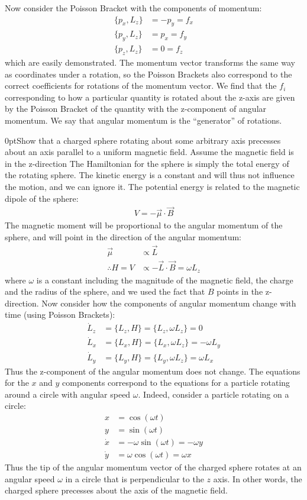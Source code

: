 Now consider the Poisson Bracket with the components of momentum:
\begin{align}
\{p_x,L_z\}&=-p_y=f_x\nonumber\\
\{p_y,L_z\}&=p_x=f_y\nonumber\\
\{p_z,L_z\}&=0=f_z
\end{align}
which are easily demonstrated. The momentum vector transforms the same way as coordinates under a rotation, so the Poisson Brackets also correspond to the correct coefficients for rotations of the momentum vector. We find that the $f_i$ corresponding to how a particular quantity is rotated about the z-axis are given by the Poisson Bracket of the quantity with the z-component of angular momentum. We say that angular momentum is the ``generator'' of rotations.

\begin{example}{0pt}{Show that a charged sphere rotating about some arbitrary axis precesses about an axis parallel to a uniform magnetic field. Assume the magnetic field is in the z-direction}{}
The Hamiltonian for the sphere is simply the total energy of the rotating sphere. The kinetic energy is a constant and will thus not influence the motion, and we can ignore it. The potential energy is related to the magnetic dipole of the sphere:
\begin{align*}
V=-\vec\mu\cdot\vec B
\end{align*}
The magnetic moment will be proportional to the angular momentum of the sphere, and will point in the direction of the angular momentum:
\begin{align*}
\vec\mu&\propto \vec L\\
\therefore H=V&\propto -\vec L\cdot \vec B=\omega L_z
\end{align*}
where $\omega$ is a constant including the magnitude of the magnetic field, the charge and the radius of the sphere, and we used the fact that $B$ points in the z-direction. Now consider how the components of angular momentum change with time (using Poisson Brackets):
\begin{align*}
\dot L_z&=\{L_z,H\}=\{L_z,\omega L_z\}=0\\
\dot L_x&=\{L_x,H\}=\{L_x,\omega L_z\}=-\omega L_y\\
\dot L_y&=\{L_y,H\}=\{L_y,\omega L_z\}=\omega L_x
\end{align*}
Thus the z-component of the angular momentum does not change. The equations for the $x$ and $y$ components correspond to the equations for a particle rotating around a circle with angular speed $\omega$. Indeed, consider a particle rotating on a circle:
\begin{align*}
x&=\cos(\omega t)\\
y&=\sin(\omega t)\\
\dot x &=-\omega\sin(\omega t)=-\omega y\\
\dot y &=\omega\cos(\omega t)=\omega x
\end{align*}
Thus the tip of the angular momentum vector of the charged sphere rotates at an angular speed $\omega$ in a circle that is perpendicular to the $z$ axis. In other words, the charged sphere precesses about the axis of the magnetic field.
\end{example}

